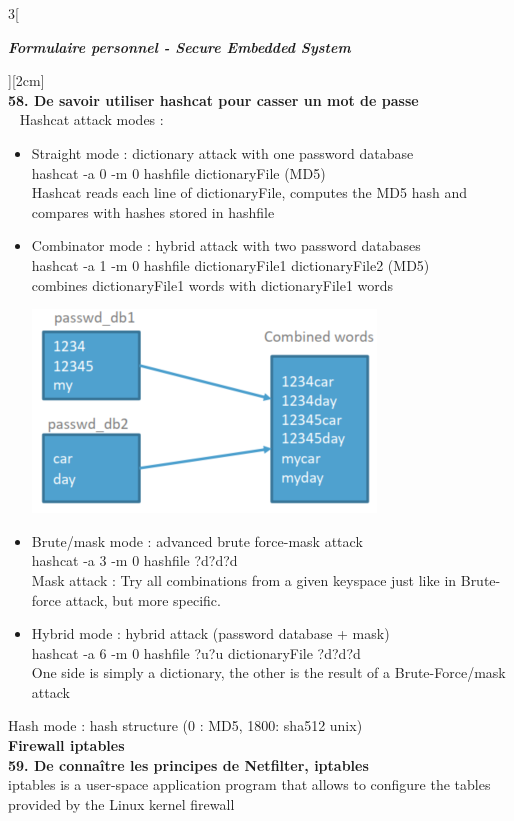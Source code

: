 \begin{multicols}{3}[\centerline{ \large\em \textbf{Formulaire personnel - Secure Embedded System}}][2cm]
\\ \textbf{58. De savoir utiliser hashcat pour casser un mot de passe\\}~
Hashcat attack modes :
\begin{itemize}
\item Straight mode : dictionary attack with one password database\\
hashcat -a 0 -m 0 hashfile dictionaryFile (MD5)\\
Hashcat reads each line of dictionaryFile, computes the MD5 hash and compares with hashes stored in hashfile
\item Combinator mode : hybrid attack with two password databases\\
hashcat -a 1 -m 0 hashfile dictionaryFile1 dictionaryFile2 (MD5)\\
combines dictionaryFile1 words with dictionaryFile1 words\\
\begin{minipage}{\linewidth}
	\centering
    \includegraphics[width =0.4\columnwidth]{images/41.png}
\end{minipage}
\item Brute/mask mode : advanced brute force-mask attack\\
 hashcat -a 3 -m 0 hashfile ?d?d?d\\
Mask attack : Try all combinations from a given keyspace just like in Brute-force attack, but more specific.
\item Hybrid mode :  hybrid attack (password database + mask)\\
hashcat -a 6 -m 0 hashfile ?u?u dictionaryFile ?d?d?d\\
One side is simply a dictionary, the other is the result of a Brute-Force/mask attack
\end{itemize} 
Hash mode : hash structure (0 : MD5, 1800: sha512 unix)\\
{\Large \textbf{Firewall iptables}}\\
\textbf{59. De connaître les principes de Netfilter, iptables\\}
iptables is a user-space application program that allows to configure the
tables provided by the Linux kernel firewall \\

\end{multicols}
